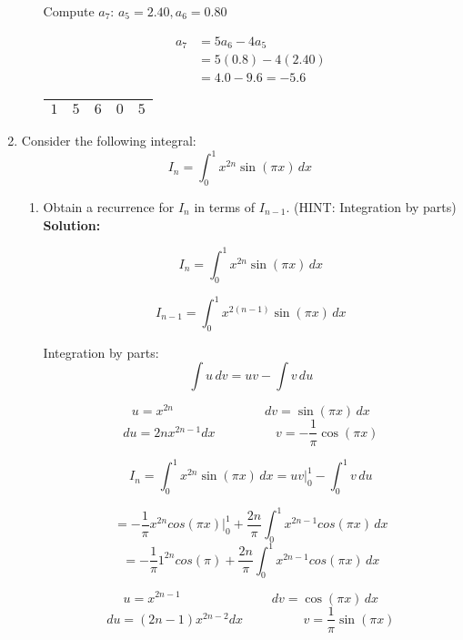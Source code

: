\documentclass{article}
\begin{document}
\begin{enumerate}
\begin{enumerate}
        Compute $a_{7}$: $a_{5} = 2.40, a_{6} = 0.80$

        \begin{align*}
        a_{7} &= 5a_{6} - 4a_{5} \\
            &= 5(0.8) - 4(2.40) \\ 
            &= 4.0 - 9.6 = -5.6
        \end{align*}

        \begin{center}
        \renewcommand{\arraystretch}{1.7}
        \begin{tabular}{|c|c|c|c|c|}
        \hline
        $1$ & $5$ & $6$ & $0$ & $5$ \\
        \hline
        \end{tabular}
        \end{center}

\end{enumerate}

\vspace{1cm}

\item Consider the following integral:
    $$I_{n} = \int_{0}^{1} x^{2n} \sin(\pi x) \,  dx$$

\begin{enumerate}
\item Obtain a recurrence for $I_{n}$ in terms of $I_{n-1}$. (HINT: Integration by parts) \\

\textbf{Solution:}

$$I_{n} = \int_{0}^{1} x^{2n} \sin(\pi x) \, dx$$

$$I_{n-1} = \int_{0}^{1} x^{2(n-1)} \sin(\pi x) \, dx$$

Integration by parts: 
    $$\int u \, dv = uv - \int v \, du$$

        $$u = x^{2n} \hspace{3cm}  dv = \sin(\pi x) \, dx$$
        $$du = 2nx^{2n-1} dx \hspace{2cm} v = -\frac{1}{\pi} \cos(\pi x)$$


        $$I_{n} = \int_{0}^{1} x^{2n} \sin(\pi x) \,  dx = uv \bigg\rvert_{0}^{1} - \int_{0}^{1} v \, du$$

        $$= - \frac{1}{\pi} x^{2n} cos(\pi x) \bigg\rvert_{0}^{1} + \frac{2n}{\pi} \int_{0}^{1} x^{2n-1} cos(\pi x) \, dx$$
        $$= - \frac{1}{\pi} 1^{2n} cos(\pi) + \frac{2n}{\pi} \int_{0}^{1} x^{2n-1} cos(\pi x) \, dx$$

        $$u = x^{2n-1} \hspace{3cm}  dv = \cos(\pi x) \, dx$$
        $$du = (2n-1)x^{2n-2} dx \hspace{2cm} v = \frac{1}{\pi} \sin(\pi x)$$


\end{enumerate}
\end{enumerate}
\end{document}
